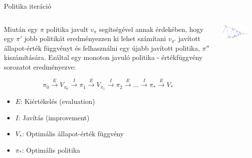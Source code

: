 \documentclass[english, aspectratio=169]{beamer}
\begin{document}
\begin{frame}{Politika iteráció}
\begin{columns}
\begin{column}{.6\textwidth}
Miután egy $\pi$ politika javult $v_\pi$ segítségével annak érdekében, hogy egy $\pi'$ jobb politikát eredményezzen ki lehet számítani $v_{\pi'}$ javított állapot-érték függvényt és felhasználni egy újabb javított politika, $\pi''$ kiszámítására. Ezáltal egy monoton javuló politika - értékfüggvény sorozatot eredményezve:
\begin{small}
\[
\pi_{0}\stackrel{E}{\longrightarrow}V_{\pi_{0}}\stackrel{I}{\longrightarrow}\pi_{1}\stackrel{E}{\longrightarrow}V_{\pi_{1}}\stackrel{I}{\longrightarrow}\pi_{2}\stackrel{E}{\longrightarrow}\hdots\stackrel{I}{\longrightarrow}\pi_{*}\stackrel{E}{\longrightarrow}V_{*}
\]
\begin{itemize}
	\item $E$: Kiértékelés (evaluation)\\
	\item $I$: Javítás (improvement)
	\item $V_{*}$: Optimális állapot-érték függvény
	\item $\pi_{*}$: Optimális politika
\end{itemize}
\end{small}
\end{column}
\begin{column}{.4\textwidth}
\begin{center}
\includegraphics[width=6cm, keepaspectratio]{images/solving_11.png}
\end{center}
\end{column}
\end{columns}
\end{frame}
\end{document}
